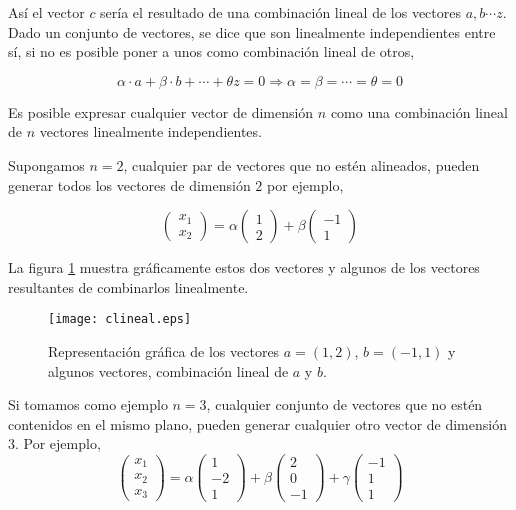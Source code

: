 Así el vector $c$ sería el resultado de una combinación  lineal de los vectores $a, b \cdots z$. 
Dado un conjunto de vectores, se dice que son linealmente independientes entre sí, si no es posible poner a unos como combinación lineal de otros,

\begin{equation*}
\alpha \cdot a + \beta \cdot b + \cdots +\theta z=0 \Rightarrow \alpha =\beta =\cdots =\theta =0
\end{equation*}



Es posible expresar cualquier vector de dimensión $n$ como una combinación lineal de $n$ vectores linealmente independientes.

Supongamos $n=2$, cualquier par de vectores que no estén alineados, pueden generar todos los vectores de dimensión $2$ por ejemplo,

\begin{equation*}
\begin{pmatrix}
x_1\\
x_2
\end{pmatrix}=
\alpha \begin{pmatrix}
1\\
2
\end{pmatrix}+\beta \begin{pmatrix}
-1\\
1
\end{pmatrix}
\end{equation*}

La figura \ref{fig:clineal} muestra gráficamente estos dos vectores y algunos de los vectores resultantes de combinarlos linealmente.

\begin{figure}[h]
\centering
\texttt{[image: clineal.eps]}
\caption{Representación gráfica de los vectores $a=(1,2)
$, $b=(-1,1)
$ y algunos vectores, combinación lineal de $a$ y $b$.}
\label{fig:clineal}
\end{figure}
Si tomamos como ejemplo $n=3$, cualquier conjunto de vectores que no estén contenidos en el mismo plano, pueden generar cualquier otro vector de dimensión $3$. Por ejemplo,
\begin{equation*}
\begin{pmatrix}
x_1\\
x_2\\
x_3
\end{pmatrix}=\alpha \begin{pmatrix}
1\\
-2\\
1
\end{pmatrix}+ \beta \begin{pmatrix}
2\\
0\\
-1
\end{pmatrix}+ \gamma \begin{pmatrix}
-1\\
1\\
1
\end{pmatrix}
\end{equation*}

